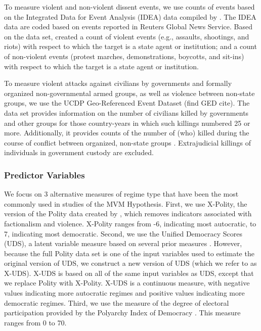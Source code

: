 \documentclass[titlepage, onecolumn,12pt]{article}
\begin{document}
To measure violent and non-violent dissent events, we use counts of events based on the Integrated Data for Event Analysis (IDEA) data \citep{bond2003integrated} compiled by \citet{murdie2011aiding}. The IDEA data are coded based on events reported in Reuters Global News Service.  Based on the data set, \citet{murdie2011aiding} created a count of violent events (e.g., assaults, shootings, and riots) with respect to which the target is a state agent or institution; and a count of non-violent events (protest marches, demonstrations, boycotts, and sit-ins) with respect to which the target is a state agent or institution.

To measure violent attacks against civilians by governments and formally organized non-governmental armed groups, as well as violence between non-state groups, we use the UCDP Geo-Referenced Event Dataset \citep{eck2007one,sundberg2009revisiting} (find GED cite). The data set provides information on the number of civilians killed by governments and other groups for those country-years in which such killings numbered 25 or more. Additionally, it provides counts of the number of (who) killed during the course of conflict between organized, non-state groups \citep{sundberg2012introducing}. Extrajudicial killings of individuals in government custody are excluded.

\subsubsection{Predictor Variables}

We focus on 3 alternative measures of regime type that have been the most commonly used in studies of the MVM Hypothesis. First, we use X-Polity, the version of the Polity data created by \citet{vreeland2008effect}, which removes indicators associated with factionalism and violence. X-Polity ranges from -6, indicating most autocratic, to 7, indicating most democratic. Second, we use the Unified Democracy Scores (UDS), a latent variable measure based on several prior measures \citep{pemstein2010democratic}. However, because the full Polity data set is one of the input variables used to estimate the original version of UDS, we construct a new version of UDS (which we refer to as X-UDS). X-UDS is based on all of the same input variables as UDS, except that we replace Polity with X-Polity. X-UDS is a continuous measure, with negative values indicating more autocratic regimes and positive values indicating more democratic regimes. Third, we use the measure of the degree of electoral participation provided by the Polyarchy Index of Democracy \citep{vanhanen2000new}. This measure ranges from 0 to 70.
\end{document}
